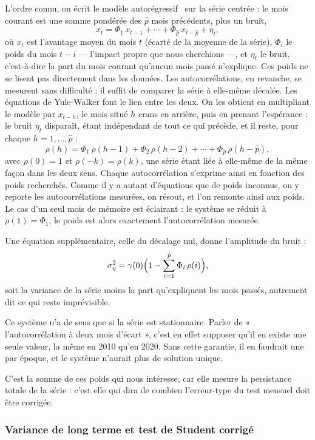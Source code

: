 L'ordre connu, on écrit le modèle autorégressif~\cite{boxjenkins1970} sur la
série centrée : le
mois courant est une somme pondérée des \(\hat p\) mois précédents, plus un
bruit,
\[
  x_t = \Phi_1\, x_{t-1} + \cdots + \Phi_{\hat p}\, x_{t-\hat p} + \eta_t ,
\]
où \(x_t\) est l'avantage moyen du mois \(t\) (écarté de la moyenne de la
série), \(\Phi_i\) le poids du mois \(t-i\) — l'impact propre que nous
cherchions —, et \(\eta_t\) le bruit, c'est-à-dire la part du mois courant
qu'aucun mois passé n'explique.
Ces poids ne se lisent pas directement dans les données. Les autocorrélations,
en revanche, se mesurent sans difficulté : il suffit de comparer la série à
elle-même décalée. Les équations de Yule-Walker font le lien entre les deux.
On les obtient en multipliant le modèle par \(x_{t-h}\), le mois situé \(h\)
crans en arrière, puis en prenant l'espérance : le bruit \(\eta_t\) disparaît,
étant indépendant de tout ce qui précède, et il reste, pour chaque
\(h = 1, \ldots, \hat p\) :
\[
  \rho(h) = \Phi_1\,\rho(h-1) + \Phi_2\,\rho(h-2) + \cdots + \Phi_{\hat p}\,\rho(h-\hat p),
\]
avec \(\rho(0) = 1\) et \(\rho(-k) = \rho(k)\), une série étant liée à
elle-même de la même façon dans les deux sens. Chaque autocorrélation
s'exprime ainsi en fonction des poids recherchés. Comme il y a autant
d'équations que de poids inconnus, on y reporte les autocorrélations mesurées,
on résout, et l'on remonte ainsi aux poids. Le cas d'un seul mois de mémoire
est éclairant : le système se réduit à \(\rho(1) = \Phi_1\), le poids est
alors exactement l'autocorrélation mesurée.

Une équation supplémentaire, celle du décalage nul, donne l'amplitude du
bruit :
\[
  \sigma^2_\eta = \gamma(0)\Bigl(1 - \sum_{i=1}^{\hat p} \Phi_i\,\rho(i)\Bigr),
\]
soit la variance de la série moins la part qu'expliquent les mois passés,
autrement dit ce qui reste imprévisible.

Ce système n'a de sens que si la série est stationnaire. Parler de
« l'autocorrélation à deux mois d'écart », c'est en effet supposer qu'il en
existe une seule valeur, la même en 2010 qu'en 2020. Sans cette garantie, il
en faudrait une par époque, et le système n'aurait plus de solution unique.

C'est la somme de ces poids qui nous intéresse, car elle mesure la persistance
totale de la série : c'est elle qui dira de combien l'erreur-type du test
mensuel doit être corrigée.

\subsubsection*{Variance de long terme et test de Student corrigé}

